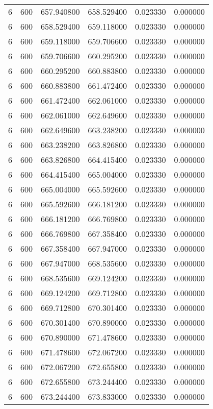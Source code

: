\begin{longtable}{rrrrrr}
6 & 600 & 657.940800 & 658.529400 & 0.023330 & 0.000000 \\
6 & 600 & 658.529400 & 659.118000 & 0.023330 & 0.000000 \\
6 & 600 & 659.118000 & 659.706600 & 0.023330 & 0.000000 \\
6 & 600 & 659.706600 & 660.295200 & 0.023330 & 0.000000 \\
6 & 600 & 660.295200 & 660.883800 & 0.023330 & 0.000000 \\
6 & 600 & 660.883800 & 661.472400 & 0.023330 & 0.000000 \\
6 & 600 & 661.472400 & 662.061000 & 0.023330 & 0.000000 \\
6 & 600 & 662.061000 & 662.649600 & 0.023330 & 0.000000 \\
6 & 600 & 662.649600 & 663.238200 & 0.023330 & 0.000000 \\
6 & 600 & 663.238200 & 663.826800 & 0.023330 & 0.000000 \\
6 & 600 & 663.826800 & 664.415400 & 0.023330 & 0.000000 \\
6 & 600 & 664.415400 & 665.004000 & 0.023330 & 0.000000 \\
6 & 600 & 665.004000 & 665.592600 & 0.023330 & 0.000000 \\
6 & 600 & 665.592600 & 666.181200 & 0.023330 & 0.000000 \\
6 & 600 & 666.181200 & 666.769800 & 0.023330 & 0.000000 \\
6 & 600 & 666.769800 & 667.358400 & 0.023330 & 0.000000 \\
6 & 600 & 667.358400 & 667.947000 & 0.023330 & 0.000000 \\
6 & 600 & 667.947000 & 668.535600 & 0.023330 & 0.000000 \\
6 & 600 & 668.535600 & 669.124200 & 0.023330 & 0.000000 \\
6 & 600 & 669.124200 & 669.712800 & 0.023330 & 0.000000 \\
6 & 600 & 669.712800 & 670.301400 & 0.023330 & 0.000000 \\
6 & 600 & 670.301400 & 670.890000 & 0.023330 & 0.000000 \\
6 & 600 & 670.890000 & 671.478600 & 0.023330 & 0.000000 \\
6 & 600 & 671.478600 & 672.067200 & 0.023330 & 0.000000 \\
6 & 600 & 672.067200 & 672.655800 & 0.023330 & 0.000000 \\
6 & 600 & 672.655800 & 673.244400 & 0.023330 & 0.000000 \\
6 & 600 & 673.244400 & 673.833000 & 0.023330 & 0.000000 \\

\end{longtable}
